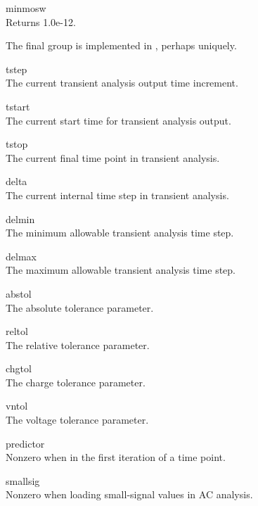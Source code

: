 \begin{description}
\begin{description}
\item{\vt minmosw}\\
Returns 1.0e-12.
\end{description}

The final group is implemented in {\WRspice}, perhaps uniquely.

\begin{description}
\item{\vt tstep}\\
The current transient analysis output time increment.

\item{\vt tstart}\\
The current start time for transient analysis output.

\item{\vt tstop}\\
The current final time point in transient analysis.

\item{\vt delta}\\
The current internal time step in transient analysis.

\item{\vt delmin}\\
The minimum allowable transient analysis time step.

\item{\vt delmax}\\
The maximum allowable transient analysis time step.

\item{\vt abstol}\\
The absolute tolerance parameter.

\item{\vt reltol}\\
The relative tolerance parameter.

\item{\vt chgtol}\\
The charge tolerance parameter.

\item{\vt vntol}\\
The voltage tolerance parameter.

\item{\vt predictor}\\
Nonzero when in the first iteration of a time point.

\item{\vt smallsig}\\
Nonzero when loading small-signal values in AC analysis.


\end{description}
\end{description}
